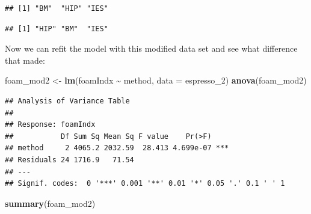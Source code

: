 \documentclass[
  a4paperpaper,
]{book}
\newenvironment{Shaded}{\begin{snugshade}}{\end{snugshade}}
\newcommand{\CommentTok}[1]{\textcolor[rgb]{0.56,0.35,0.01}{\textit{#1}}}
\newcommand{\DataTypeTok}[1]{\textcolor[rgb]{0.13,0.29,0.53}{#1}}
\newcommand{\DecValTok}[1]{\textcolor[rgb]{0.00,0.00,0.81}{#1}}
\newcommand{\KeywordTok}[1]{\textcolor[rgb]{0.13,0.29,0.53}{\textbf{#1}}}
\newcommand{\NormalTok}[1]{#1}
\newcommand{\OperatorTok}[1]{\textcolor[rgb]{0.81,0.36,0.00}{\textbf{#1}}}
\newcommand{\StringTok}[1]{\textcolor[rgb]{0.31,0.60,0.02}{#1}}
\begin{document}
\begin{Shaded}
\end{Shaded}

\begin{verbatim}
## [1] "BM"  "HIP" "IES"
\end{verbatim}

\begin{Shaded}
\end{Shaded}

\begin{verbatim}
## [1] "HIP" "BM"  "IES"
\end{verbatim}

Now we can refit the model with this modified data set and see what difference that made:

\begin{Shaded}
\begin{Highlighting}[]
\NormalTok{foam\_mod2 \textless{}{-}}\StringTok{ }\KeywordTok{lm}\NormalTok{(foamIndx }\OperatorTok{\textasciitilde{}}\StringTok{ }\NormalTok{method, }\DataTypeTok{data =}\NormalTok{ espresso\_}\DecValTok{2}\NormalTok{)}
\KeywordTok{anova}\NormalTok{(foam\_mod2)}
\end{Highlighting}
\end{Shaded}

\begin{verbatim}
## Analysis of Variance Table
## 
## Response: foamIndx
##           Df Sum Sq Mean Sq F value    Pr(>F)    
## method     2 4065.2 2032.59  28.413 4.699e-07 ***
## Residuals 24 1716.9   71.54                      
## ---
## Signif. codes:  0 '***' 0.001 '**' 0.01 '*' 0.05 '.' 0.1 ' ' 1
\end{verbatim}

\begin{Shaded}
\begin{Highlighting}[]
\KeywordTok{summary}\NormalTok{(foam\_mod2)}
\end{Highlighting}
\end{Shaded}
\end{document}
